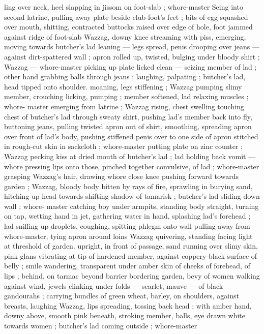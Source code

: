 ling over neck, heel slapping in jissom on foot-slab ; whore-master 
Seing into second latrine, pulling away plate beside club-foot's feet 
; bits of egg squashed over mouth, shitting, contracted buttocks 
raised over edge of hole, foot jammed against ridge of foot-slab 
Wazzag, downy knee streaming with piss, emerging, moving towards 
butcher's lad leaning --- legs spread, penis drooping over jeans --- 
against dirt-spattered wall ; apron rolled up, twisted, bulging under 
bloody shirt ; Wazzag --- whore-master picking up plate licked clean 
--- seizing member of lad ; other hand grabbing balls through jeans 
; laughing, palpating ; butcher's lad, head tipped onto shoulder. 
moaning, legs stiffening ; Wazzag pumping slimy member, crouching 
licking, pumping ; member softened, lad relaxing muscles ; whore- 
master emerging from latrine ; Wazzag rising, chest swelling 
touching chest of butcher's lad through sweaty shirt, pushing lad's 
member back into fly, buttoning jeans, pulling twisted apron out of 
shirt, smoothing, spreading apron over front of lad's body, pushing 
stiffened penis over to one side of apron stitched in rough-cut skin 
in sackcloth ; whore-master putting plate on zinc counter ; Wazzag 
pecking kiss at dried mouth of butcher's lad ; lad holding back vomit 
--- whore pressing lips onto those, pinched together convulsive, of 
lad ; whore-master grasping Wazzag's hair, drawing whore close 
knee pushing forward towards garden ; Wazzag, bloody body bitten 
by rays of fire, sprawling in burying sand, hitching up head towards 
shifting shadow of tamarisk ; butcher's lad sliding down wall ; whore- 
master catching boy under armpits, standing body straight, turning 
on tap, wetting hand in jet, gathering water in hand, splashing lad's 
forehead ; lad sniffing up droplets, coughing, spitting phlegm onto 
wall pulling away from whore-master, tying apron around loins 
Wazzag quivering, standing facing light at threshold of garden. 
upright, in front of passage, sand running over slimy skin, pink glans 
vibrating at tip of hardened member, against coppery-black surface 
of belly ; smile wandering, transparent under amber skin of cheeks 
of forehead, of lips ; behind, on tarmac beyond barrier bordering 
garden, bevy of women walking against wind, jewels clinking under 
folds --- scarlet, mauve --- of black gandourahs ; carrying bundles 
of green wheat, barley, on shoulders, against breasts, laughing 
Wazzag, lips spreading, tossing back head ; with amber hand, downy 
above, smooth pink beneath, stroking member, balls, eye drawn 
white towards women ; butcher's lad coming outside ; whore-master 
